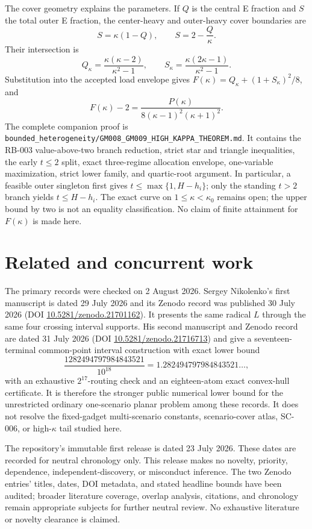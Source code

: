 \documentclass[11pt]{article}
\theoremstyle{remark}
\begin{document}
The cover geometry explains the parameters. If $Q$ is the central E fraction
and $S$ the total outer E fraction, the center-heavy and outer-heavy cover
boundaries are
\[
S=\kappa(1-Q),\qquad S=2-\frac{Q}{\kappa}.
\tag{6.5}
\]
Their intersection is
\[
Q_\kappa=\frac{\kappa(\kappa-2)}{\kappa^2-1},\qquad
S_\kappa=\frac{\kappa(2\kappa-1)}{\kappa^2-1}.
\tag{6.6}
\]
Substitution into the accepted load envelope gives
$F(\kappa)=Q_\kappa+(1+S_\kappa)^2/8$, and
\[
F(\kappa)-2=
\frac{P(\kappa)}{8(\kappa-1)^2(\kappa+1)^2}.
\tag{6.7}
\]
The complete companion proof is
\texttt{bounded\_heterogeneity/GM008\_GM009\_HIGH\_KAPPA\_THEOREM.md}. It
contains the RB-003 value-above-two branch reduction, strict star and triangle
inequalities, the early $t\le2$ split, exact three-regime allocation envelope,
one-variable maximization, strict lower family, and quartic-root argument. In
particular, a feasible outer singleton first gives
$t\le\max\{1,H-h_i\}$; only the standing $t>2$ branch yields
$t\le H-h_i$. The exact curve on $1\le\kappa<\kappa_0$ remains open; the upper
bound by two is not an equality classification. No claim of finite attainment
for $F(\kappa)$ is made here.

\section{Related and concurrent work}

The primary records were checked on 2 August 2026. Sergey Nikolenko's first
manuscript is dated 29 July 2026 and its Zenodo record was published 30 July
2026 (DOI \href{https://doi.org/10.5281/zenodo.21701162}%
{10.5281/zenodo.21701162}). It presents the same radical $L$ through the same
four crossing interval supports. His second manuscript and Zenodo record are
dated 31 July 2026 (DOI
\href{https://doi.org/10.5281/zenodo.21716713}%
{10.5281/zenodo.21716713}) and give a seventeen-terminal common-point interval
construction with exact lower bound
\[
\frac{1282494797984843521}{10^{18}}
=1.282494797984843521\ldots,
\tag{7.1}
\]
with an exhaustive $2^{17}$-routing check and an eighteen-atom exact
convex-hull certificate. It is therefore the stronger public numerical lower
bound for the unrestricted ordinary one-scenario planar problem among these
records. It does not resolve the fixed-gadget multi-scenario constants,
scenario-cover atlas, SC-006, or high-$\kappa$ tail studied here.

The repository's immutable first release is dated 23 July 2026. These dates
are recorded for neutral chronology only. This release makes no novelty,
priority, dependence, independent-discovery, or misconduct inference. The two
Zenodo entries' titles, dates, DOI metadata, and stated headline bounds have
been audited; broader literature coverage, overlap analysis, citations, and
chronology remain appropriate subjects for further neutral review. No
exhaustive literature or novelty clearance is claimed.
\end{document}
